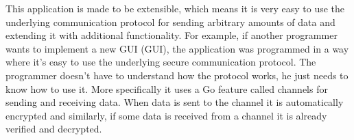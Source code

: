 This application is made to be extensible, which means it is very easy to use the underlying communication protocol for sending arbitrary amounts of data and extending it with additional functionality. For example, if another programmer wants to implement a new GUI (\acl{GUI}), the application was programmed in a way where it's easy to use the underlying secure communication protocol. The programmer doesn't have to understand how the protocol works, he just needs to know how to use it. More specifically it uses a Go feature called channels for sending and receiving data. When data is sent to the channel it is automatically encrypted and similarly, if some data is received from a channel it is already verified and decrypted.
